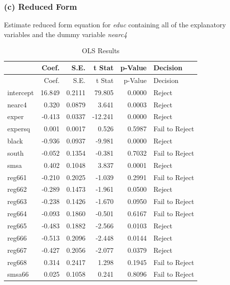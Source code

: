 \documentclass[11pt,]{article}
\newenvironment{Shaded}{\begin{snugshade}}{\end{snugshade}}
\newcommand{\KeywordTok}[1]{\textcolor[rgb]{0.13,0.29,0.53}{\textbf{#1}}}
\newcommand{\StringTok}[1]{\textcolor[rgb]{0.31,0.60,0.02}{#1}}
\newcommand{\OperatorTok}[1]{\textcolor[rgb]{0.81,0.36,0.00}{\textbf{#1}}}
\newcommand{\NormalTok}[1]{#1}
\begin{document}
\subsubsection{(c) Reduced Form}\label{c-reduced-form}

Estimate reduced form equation for \emph{educ} containing all of the
explanatory variables and the dummy variable \emph{nearc4}

\begin{Shaded}
\end{Shaded}

\begin{longtable}[]{@{}lrrrrl@{}}
\caption{OLS Results}\tabularnewline
\toprule
& Coef. & S.E. & t Stat & p-Value & Decision\tabularnewline
\midrule
\endfirsthead
\toprule
& Coef. & S.E. & t Stat & p-Value & Decision\tabularnewline
\midrule
\endhead
intercept & 16.849 & 0.2111 & 79.805 & 0.0000 & Reject\tabularnewline
nearc4 & 0.320 & 0.0879 & 3.641 & 0.0003 & Reject\tabularnewline
exper & -0.413 & 0.0337 & -12.241 & 0.0000 & Reject\tabularnewline
expersq & 0.001 & 0.0017 & 0.526 & 0.5987 & Fail to
Reject\tabularnewline
black & -0.936 & 0.0937 & -9.981 & 0.0000 & Reject\tabularnewline
south & -0.052 & 0.1354 & -0.381 & 0.7032 & Fail to
Reject\tabularnewline
smsa & 0.402 & 0.1048 & 3.837 & 0.0001 & Reject\tabularnewline
reg661 & -0.210 & 0.2025 & -1.039 & 0.2991 & Fail to
Reject\tabularnewline
reg662 & -0.289 & 0.1473 & -1.961 & 0.0500 & Reject\tabularnewline
reg663 & -0.238 & 0.1426 & -1.670 & 0.0950 & Fail to
Reject\tabularnewline
reg664 & -0.093 & 0.1860 & -0.501 & 0.6167 & Fail to
Reject\tabularnewline
reg665 & -0.483 & 0.1882 & -2.566 & 0.0103 & Reject\tabularnewline
reg666 & -0.513 & 0.2096 & -2.448 & 0.0144 & Reject\tabularnewline
reg667 & -0.427 & 0.2056 & -2.077 & 0.0379 & Reject\tabularnewline
reg668 & 0.314 & 0.2417 & 1.298 & 0.1945 & Fail to Reject\tabularnewline
smsa66 & 0.025 & 0.1058 & 0.241 & 0.8096 & Fail to Reject\tabularnewline
\bottomrule
\end{longtable}
\end{document}
